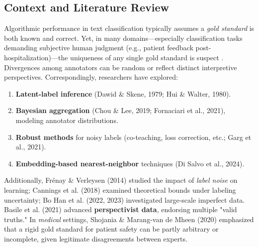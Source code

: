 \documentclass[12pt]{article}
\begin{document}
\subsection{Context and Literature Review}
Algorithmic performance in text classification typically assumes a \textit{gold standard} is both known and correct. Yet, in many domains---especially classification tasks demanding subjective human judgment (e.g., patient feedback post-hospitalization)---the uniqueness of any single gold standard is suspect \cite{dawid1979maximum, hui1980study}. Divergences among annotators can be random or reflect distinct interpretive perspectives. Correspondingly, researchers have explored:
\begin{enumerate}
\item \textbf{Latent-label inference} (Dawid \& Skene, 1979; Hui \& Walter, 1980).
\item \textbf{Bayesian aggregation} (Chou \& Lee, 2019; Fornaciari et al., 2021), modeling annotator distributions.
\item \textbf{Robust methods} for noisy labels (co-teaching, loss correction, etc.; Garg et al., 2021).
\item \textbf{Embedding-based nearest-neighbor} techniques (Di Salvo et al., 2024).
\end{enumerate}
Additionally, Fr\'enay \& Verleysen (2014) studied the impact of \textit{label noise} on learning; Cannings et al. (2018) examined theoretical bounds under labeling uncertainty; Bo Han et al. (2022, 2023) investigated large-scale imperfect data. Basile et al. (2021) advanced \textbf{perspectivist data}, endorsing multiple "valid truths." In \textit{medical} settings, Shojania \& Marang-van de Mheen (2020) emphasized that a rigid gold standard for patient safety can be partly arbitrary or incomplete, given legitimate disagreements between experts.
\end{document}
